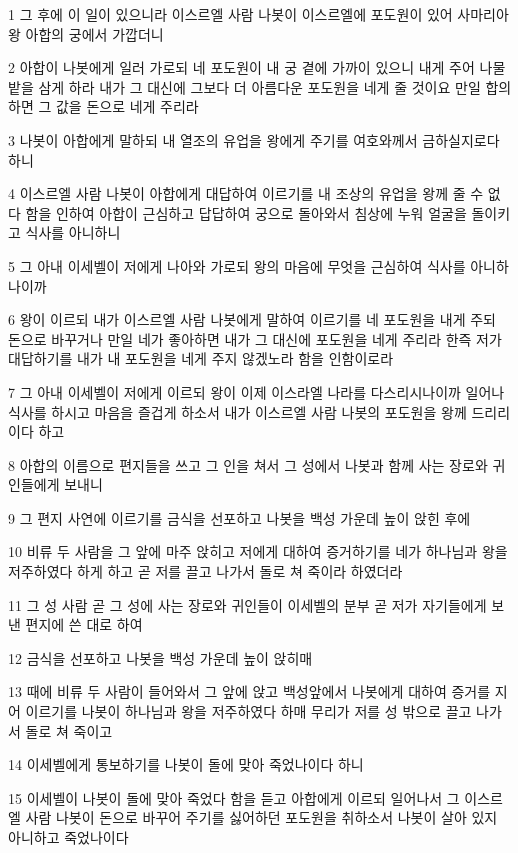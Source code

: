 \par 1 그 후에 이 일이 있으니라 이스르엘 사람 나봇이 이스르엘에 포도원이 있어 사마리아 왕 아합의 궁에서 가깝더니
\par 2 아합이 나봇에게 일러 가로되 네 포도원이 내 궁 곁에 가까이 있으니 내게 주어 나물밭을 삼게 하라 내가 그 대신에 그보다 더 아름다운 포도원을 네게 줄 것이요 만일 합의하면 그 값을 돈으로 네게 주리라
\par 3 나봇이 아합에게 말하되 내 열조의 유업을 왕에게 주기를 여호와께서 금하실지로다 하니
\par 4 이스르엘 사람 나봇이 아합에게 대답하여 이르기를 내 조상의 유업을 왕께 줄 수 없다 함을 인하여 아합이 근심하고 답답하여 궁으로 돌아와서 침상에 누워 얼굴을 돌이키고 식사를 아니하니
\par 5 그 아내 이세벨이 저에게 나아와 가로되 왕의 마음에 무엇을 근심하여 식사를 아니하나이까
\par 6 왕이 이르되 내가 이스르엘 사람 나봇에게 말하여 이르기를 네 포도원을 내게 주되 돈으로 바꾸거나 만일 네가 좋아하면 내가 그 대신에 포도원을 네게 주리라 한즉 저가 대답하기를 내가 내 포도원을 네게 주지 않겠노라 함을 인함이로라
\par 7 그 아내 이세벨이 저에게 이르되 왕이 이제 이스라엘 나라를 다스리시나이까 일어나 식사를 하시고 마음을 즐겁게 하소서 내가 이스르엘 사람 나봇의 포도원을 왕께 드리리이다 하고
\par 8 아합의 이름으로 편지들을 쓰고 그 인을 쳐서 그 성에서 나봇과 함께 사는 장로와 귀인들에게 보내니
\par 9 그 편지 사연에 이르기를 금식을 선포하고 나봇을 백성 가운데 높이 앉힌 후에
\par 10 비류 두 사람을 그 앞에 마주 앉히고 저에게 대하여 증거하기를 네가 하나님과 왕을 저주하였다 하게 하고 곧 저를 끌고 나가서 돌로 쳐 죽이라 하였더라
\par 11 그 성 사람 곧 그 성에 사는 장로와 귀인들이 이세벨의 분부 곧 저가 자기들에게 보낸 편지에 쓴 대로 하여
\par 12 금식을 선포하고 나봇을 백성 가운데 높이 앉히매
\par 13 때에 비류 두 사람이 들어와서 그 앞에 앉고 백성앞에서 나봇에게 대하여 증거를 지어 이르기를 나봇이 하나님과 왕을 저주하였다 하매 무리가 저를 성 밖으로 끌고 나가서 돌로 쳐 죽이고
\par 14 이세벨에게 통보하기를 나봇이 돌에 맞아 죽었나이다 하니
\par 15 이세벨이 나봇이 돌에 맞아 죽었다 함을 듣고 아합에게 이르되 일어나서 그 이스르엘 사람 나봇이 돈으로 바꾸어 주기를 싫어하던 포도원을 취하소서 나봇이 살아 있지 아니하고 죽었나이다
